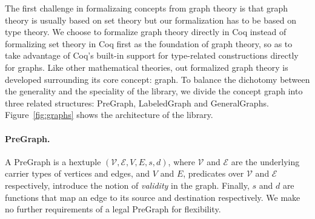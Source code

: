 The first challenge in formalizaing concepts from graph theory is that
graph theory is usually based on set theory but our formalization has
to be based on type theory. We choose to formalize graph theory
directly in Coq instead of formalizing set theory in Coq first as the
foundation of graph theory, so as to take advantage of Coq's built-in
support for type-related constructions directly for graphs. Like other
mathematical theories, out formalized graph theory is developed
surrounding its core concept: graph. To balance the dichotomy between
the generality and the speciality of the library, we divide the
concept graph into three related structures: PreGraph, LabeledGraph
and GeneralGraphs. {\color{magenta}Figure~\ref{fig:graphs}} shows the
architecture of the library.


\iftrue
{}%

\paragraph{PreGraph.} A PreGraph is a hextuple $(\mathcal{V}, \mathcal{E}, V, 
E, s, d)$, where $\mathcal{V}$ and $\mathcal{E}$ are the underlying
carrier types of vertices and edges, and $V$ and $E$, predicates over
$\mathcal{V}$ and $\mathcal{E}$ respectively, introduce the notion
of \emph{validity} in the graph. Finally, $s$ and $d$ are functions
that map an edge to its source and destination respectively. We make
no further requirements of a legal PreGraph for flexibility.

